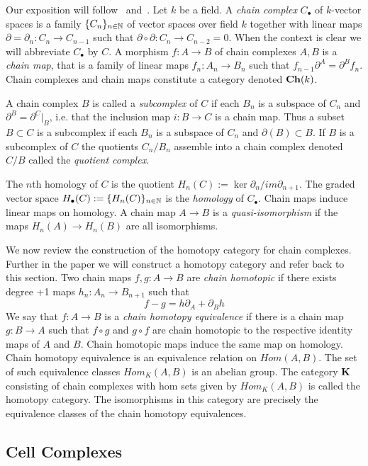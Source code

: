 Our exposition will follow~\cite{weibel} and~\cite{gelfand}.  Let $k$ be a field.  A {\em chain complex} $C_\bullet$ of $k$-vector spaces is a family $\{C_n\}_{n\in {\mathbb{N}}}$ of vector spaces over field $k$ together with linear maps $\partial=\partial_n:C_n\to C_{n-1}$ such that $\partial\circ\partial: C_n\to C_{n-2}=0$.  When the context is clear we will abbreviate $C_\bullet$ by $C$.  A morphism $f:A\to B$ of chain complexes $A,B$ is a {\em chain map}, that is a family of linear maps $f_n:A_n\to B_n$ such that $f_{n-1}\partial^A = \partial^B f_n$. Chain complexes and chain maps constitute a category denoted ${\bf Ch}(k)$.  

A chain complex $B$ is called a {\em subcomplex} of $C$ if each $B_n$ is a subspace of $C_n$ and $\partial^B= \partial^C|_B$, i.e. that the inclusion map $i:B\to C$ is a chain map.  Thus a subset $B\subset C$ is a subcomplex if each $B_n$ is a subspace of $C_n$ and $\partial( B)\subset B$.  If $B$ is a subcomplex of $C$ the quotients $C_n/B_n$ assemble into a chain complex denoted $C/B$ called the {\em quotient complex}.   

 The $n$th homology of $C$ is the quotient $H_n(C):= \ker \partial_n/im \partial_{n+1}$.  The graded vector space $H_\bullet(C) := \{H_n(C)\}_{n\in {\mathbb{N}}}$ is the {\em homology} of $C_\bullet$.  Chain maps induce linear maps on homology.  A chain map $A\to B$ is a {\em quasi-isomorphism} if the maps $H_n(A)\to H_n(B)$ are all isomorphisms.

We now review the construction of the homotopy category for chain complexes.  Further in the paper we will construct a homotopy category and refer back to this section.  Two chain maps $f,g:A\to B$ are {\em chain homotopic} if there exists degree +1 maps $h_n:A_n\to B_{n+1}$ such that $$f-g = h\partial_A+\partial_Bh$$  We say that $f:A\to B$ is a {\em chain homotopy equivalence} if there is a chain map $g:B\to A$ such that $f\circ g$ and $g\circ f$ are chain homotopic to the respective identity maps of $A$ and $B$. Chain homotopic maps induce the same map on homology.   Chain homotopy equivalence is an equivalence relation on $Hom(A,B)$.  The set of such equivalence classes $Hom_K(A,B)$ is an abelian group.  The category ${\bf K}$ consisting of chain complexes with hom sets given by $Hom_K(A,B)$ is called the homotopy category.  The isomorphisms in this category are precisely the equivalence classes of the chain homotopy equivalences.  

\subsection{Cell Complexes}

